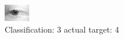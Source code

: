 \begin{figure}[h!]
\begin{center}
\includegraphics[width=0.60\columnwidth]{figures/ID2647_class_3_target_4.png}
\end{center}
\caption{ Classification: 3 actual target: 4}
\label{fig:ID2647_class_3_target_4}
\end{figure}

